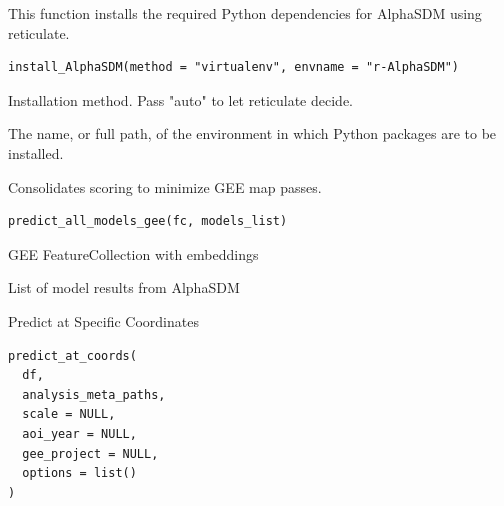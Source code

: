 \documentclass[letterpaper]{book}
\begin{document}
%
\begin{Description}
This function installs the required Python dependencies for AlphaSDM
using reticulate.
\end{Description}
%
\begin{Usage}
\begin{verbatim}
install_AlphaSDM(method = "virtualenv", envname = "r-AlphaSDM")
\end{verbatim}
\end{Usage}
%
\begin{Arguments}
\begin{ldescription}
\item[\code{method}] Installation method. Pass "auto" to let reticulate decide.

\item[\code{envname}] The name, or full path, of the environment in which Python packages are to be installed.
\end{ldescription}
\end{Arguments}
%
\begin{Description}
Consolidates scoring to minimize GEE map passes.
\end{Description}
%
\begin{Usage}
\begin{verbatim}
predict_all_models_gee(fc, models_list)
\end{verbatim}
\end{Usage}
%
\begin{Arguments}
\begin{ldescription}
\item[\code{fc}] GEE FeatureCollection with embeddings

\item[\code{models\_list}] List of model results from AlphaSDM
\end{ldescription}
\end{Arguments}
%
\begin{Description}
Predict at Specific Coordinates
\end{Description}
%
\begin{Usage}
\begin{verbatim}
predict_at_coords(
  df,
  analysis_meta_paths,
  scale = NULL,
  aoi_year = NULL,
  gee_project = NULL,
  options = list()
)
\end{verbatim}
\end{Usage}
\end{document}
